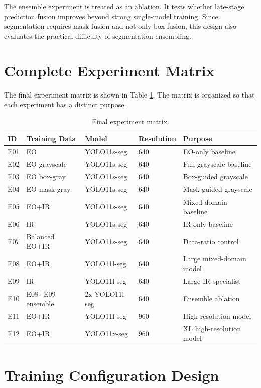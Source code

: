 The ensemble experiment is treated as an ablation. It tests whether late-stage prediction fusion improves beyond strong single-model training. Since segmentation requires mask fusion and not only box fusion, this design also evaluates the practical difficulty of segmentation ensembling.

\section{Complete Experiment Matrix}

The final experiment matrix is shown in Table \ref{tab:experiment_matrix}. The matrix is organized so that each experiment has a distinct purpose.

\begin{table}[h]
\centering
\caption{Final experiment matrix.}
\label{tab:experiment_matrix}
\small
\begin{tabular}{llllp{4.2cm}}
\hline
\textbf{ID} & \textbf{Training Data} & \textbf{Model} & \textbf{Resolution} & \textbf{Purpose} \\
\hline
E01 & EO & YOLO11s-seg & 640 & EO-only baseline \\
E02 & EO grayscale & YOLO11s-seg & 640 & Full grayscale baseline \\
E03 & EO box-gray & YOLO11s-seg & 640 & Box-guided grayscale \\
E04 & EO mask-gray & YOLO11s-seg & 640 & Mask-guided grayscale \\
E05 & EO+IR & YOLO11s-seg & 640 & Mixed-domain baseline \\
E06 & IR & YOLO11s-seg & 640 & IR-only baseline \\
E07 & Balanced EO+IR & YOLO11s-seg & 640 & Data-ratio control \\
E08 & EO+IR & YOLO11l-seg & 640 & Large mixed-domain model \\
E09 & IR & YOLO11l-seg & 640 & Large IR specialist \\
E10 & E08+E09 ensemble & 2x YOLO11l-seg & 640 & Ensemble ablation \\
E11 & EO+IR & YOLO11l-seg & 960 & High-resolution model \\
E12 & EO+IR & YOLO11x-seg & 960 & XL high-resolution model \\
\hline
\end{tabular}
\end{table}

\section{Training Configuration Design}

